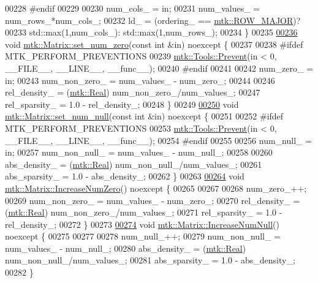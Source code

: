 \begin{DoxyCode}
00228 \textcolor{preprocessor}{  #endif}
00229 
00230   num\_cols\_ = in;
00231   num\_values\_ = num\_rows\_*num\_cols\_;
00232   ld\_ = (ordering\_ == \hyperlink{namespacemtk_ga622801bd9f912d0f976c3e383f5f581cabc55178ac16eb1ce89b5f3ab915a91f3}{mtk::ROW\_MAJOR})?
00233     std::max(1,num\_cols\_): std::max(1,num\_rows\_);
00234 \}
00235 
\hypertarget{mtk__matrix_8cc_source_l00236}{}\hyperlink{classmtk_1_1Matrix_a6eb14709692df59573548ffd8cf67198}{00236} \textcolor{keywordtype}{void} \hyperlink{classmtk_1_1Matrix_a6eb14709692df59573548ffd8cf67198}{mtk::Matrix::set\_num\_zero}(\textcolor{keyword}{const} \textcolor{keywordtype}{int} &in) noexcept \{
00237 
00238 \textcolor{preprocessor}{  #ifdef MTK\_PERFORM\_PREVENTIONS}
00239   \hyperlink{classmtk_1_1Tools_a332324c6f25e66be9dff48c5987a3b9f}{mtk::Tools::Prevent}(in < 0, \_\_FILE\_\_, \_\_LINE\_\_, \_\_func\_\_);
00240 \textcolor{preprocessor}{  #endif}
00241 
00242   num\_zero\_ = in;
00243   num\_non\_zero\_ = num\_values\_ - num\_zero\_;
00244 
00246   rel\_density\_ = (\hyperlink{group__c01-roots_gac080bbbf5cbb5502c9f00405f894857d}{mtk::Real}) num\_non\_zero\_/num\_values\_;
00247   rel\_sparsity\_ = 1.0 - rel\_density\_;
00248 \}
00249 
\hypertarget{mtk__matrix_8cc_source_l00250}{}\hyperlink{classmtk_1_1Matrix_a61dba12c767f98cda5343b4b16bbbe77}{00250} \textcolor{keywordtype}{void} \hyperlink{classmtk_1_1Matrix_a61dba12c767f98cda5343b4b16bbbe77}{mtk::Matrix::set\_num\_null}(\textcolor{keyword}{const} \textcolor{keywordtype}{int} &in) noexcept \{
00251 
00252 \textcolor{preprocessor}{  #ifdef MTK\_PERFORM\_PREVENTIONS}
00253   \hyperlink{classmtk_1_1Tools_a332324c6f25e66be9dff48c5987a3b9f}{mtk::Tools::Prevent}(in < 0, \_\_FILE\_\_, \_\_LINE\_\_, \_\_func\_\_);
00254 \textcolor{preprocessor}{  #endif}
00255 
00256   num\_null\_ = in;
00257   num\_non\_null\_ = num\_values\_ - num\_null\_;
00258 
00260   abs\_density\_ = (\hyperlink{group__c01-roots_gac080bbbf5cbb5502c9f00405f894857d}{mtk::Real}) num\_non\_null\_/num\_values\_;
00261   abs\_sparsity\_ = 1.0 - abs\_density\_;
00262 \}
00263 
\hypertarget{mtk__matrix_8cc_source_l00264}{}\hyperlink{classmtk_1_1Matrix_ace7cb5c31d0de66b8f9c63cd542c9e63}{00264} \textcolor{keywordtype}{void} \hyperlink{classmtk_1_1Matrix_ace7cb5c31d0de66b8f9c63cd542c9e63}{mtk::Matrix::IncreaseNumZero}() noexcept \{
00265 
00267 
00268   num\_zero\_++;
00269   num\_non\_zero\_ = num\_values\_ - num\_zero\_;
00270   rel\_density\_ = (\hyperlink{group__c01-roots_gac080bbbf5cbb5502c9f00405f894857d}{mtk::Real}) num\_non\_zero\_/num\_values\_;
00271   rel\_sparsity\_ = 1.0 - rel\_density\_;
00272 \}
00273 
\hypertarget{mtk__matrix_8cc_source_l00274}{}\hyperlink{classmtk_1_1Matrix_af4bba5c43d1f09f5059a04298ba24568}{00274} \textcolor{keywordtype}{void} \hyperlink{classmtk_1_1Matrix_af4bba5c43d1f09f5059a04298ba24568}{mtk::Matrix::IncreaseNumNull}() noexcept \{
00275 
00277 
00278   num\_null\_++;
00279   num\_non\_null\_ = num\_values\_ - num\_null\_;
00280   abs\_density\_ = (\hyperlink{group__c01-roots_gac080bbbf5cbb5502c9f00405f894857d}{mtk::Real}) num\_non\_null\_/num\_values\_;
00281   abs\_sparsity\_ = 1.0 - abs\_density\_;
00282 \}
\end{DoxyCode}
